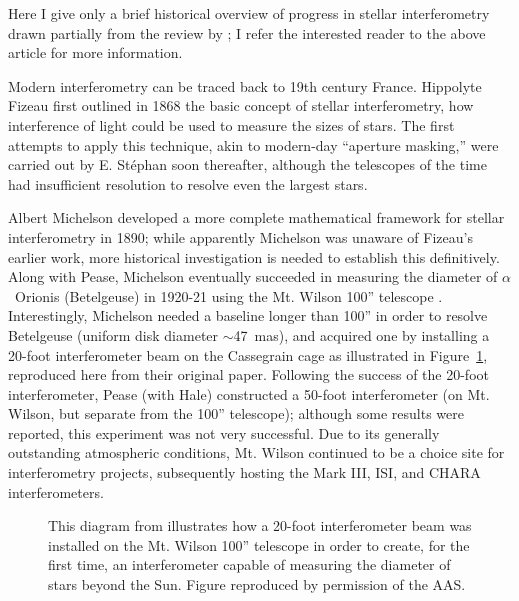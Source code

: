 \documentclass[12pt]{iopart}
\begin{document}
Here I give only a brief historical overview of progress in stellar
interferometry drawn partially from the review by \citet{lawson2000}; I refer
the interested reader to the above article for more  information.

Modern interferometry can be traced back to 19th century France.
Hippolyte Fizeau first outlined in 1868 the basic concept of stellar 
interferometry, how interference of light could be used to
measure the sizes of stars.  The first attempts to apply this technique,
akin to modern-day ``aperture masking,'' were carried out
by E. St{\' e}phan soon thereafter, although the telescopes of the time had
insufficient resolution to resolve even the largest stars.

Albert Michelson developed a more complete mathematical framework for
stellar interferometry in 1890; while apparently Michelson was unaware
of Fizeau's earlier work, more historical investigation is needed to
establish this definitively.  Along with Pease, Michelson
\citep{michelson1921} eventually succeeded in measuring the diameter
of $\alpha$~Orionis (Betelgeuse) in 1920-21 using the Mt. Wilson 100''
telescope \citep[following earlier measurements of Jupiter's
moons;][]{michelson90,michelson91}.  Interestingly, Michelson needed a
baseline longer than 100'' in order to resolve Betelgeuse (uniform
disk diameter $\sim$47~mas), and acquired one by installing a 20-foot
interferometer beam on the Cassegrain cage as illustrated in
Figure~\ref{monnier_michelson100}, reproduced here from their original
paper.  Following the success of the 20-foot interferometer, Pease
(with Hale) constructed a 50-foot interferometer (on Mt. Wilson, but
separate from the 100'' telescope); although some results were
reported, this experiment was not very successful.  Due to its
generally outstanding atmospheric conditions, Mt. Wilson continued to
be a choice site for interferometry projects, subsequently hosting the Mark III,
ISI, and CHARA interferometers.


\begin{figure}
\begin{center}
\caption{This diagram from \citet[][Figure 1]{michelson1921}
illustrates how a 20-foot interferometer beam was installed on
the Mt. Wilson 100'' telescope in order to create, for the
first time, an
interferometer capable of measuring the
diameter of stars beyond the Sun.  Figure reproduced by permission of the AAS.
\label{monnier_michelson100}}
\end{center}
\end{figure}
\end{document}
